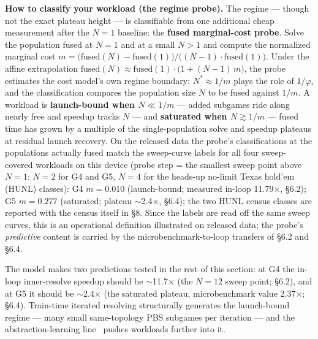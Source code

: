\documentclass[11pt]{article}
\begin{document}
\begin{framed}
\noindent\textbf{How to classify your workload (the regime probe).} The regime ---
though not the exact plateau height --- is classifiable from one additional cheap
measurement after the $N{=}1$ baseline: the \textbf{fused marginal-cost probe}. Solve the
population fused at $N{=}1$ and at a small
$N{>}1$ and compute the normalized marginal cost $m = \big(\text{fused}(N) -
\text{fused}(1)\big)/\big((N{-}1)\cdot\text{fused}(1)\big)$. Under the affine
extrapolation $\text{fused}(N) \approx \text{fused}(1)\cdot\big(1 + (N{-}1)\,m\big)$,
the probe estimates the cost model's own regime boundary: $N^* \approx 1/m$ plays the
role of $1/\varphi$, and the classification compares the population size $N$ to be fused
against $1/m$. A workload is \textbf{launch-bound when $N \ll 1/m$} --- added subgames
ride along nearly free and speedup tracks $N$ --- and \textbf{saturated when $N \gtrsim
1/m$} --- fused time has grown by a multiple of the single-population solve and speedup
plateaus at residual launch recovery. On the released data the probe's classifications
at the populations actually fused match the sweep-curve labels for all four
sweep-covered workloads on this device (probe step = the smallest sweep point above
$N{=}1$: $N{=}2$ for G4 and G5, $N{=}4$ for the heads-up no-limit Texas hold'em (HUNL)
classes): G4 $m = 0.010$
(launch-bound; measured in-loop 11.79$\times$, \S6.2); G5 $m = 0.277$ (saturated;
plateau $\sim$2.4$\times$, \S6.4); the two HUNL census classes are reported with the
census itself in \S8. Since the labels are read off the same sweep curves, this is an
operational definition illustrated on released data; the probe's \emph{predictive}
content is carried by the microbenchmark-to-loop transfers of \S6.2 and \S6.4.
\end{framed}

The model makes two predictions tested in the rest of this section: at G4 the in-loop
inner-resolve speedup should be $\sim$11.7$\times$ (the $N{=}12$ sweep point; \S6.2),
and at G5 it should be $\sim$2.4$\times$ (the saturated plateau, microbenchmark value
2.37$\times$; \S6.4). Train-time iterated resolving structurally generates the
launch-bound regime --- many small same-topology PBS subgames per iteration --- and the
abstraction-learning line~\citep{LAMIR} pushes workloads further into it.
\end{document}
